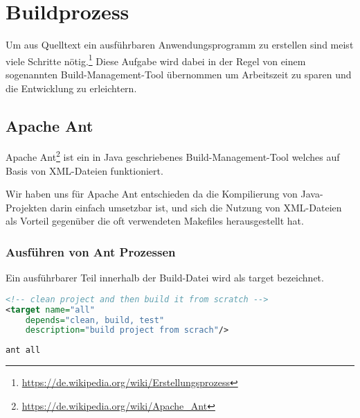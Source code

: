 

\section{Buildprozess}

Um aus Quelltext ein ausf\"uhrbaren Anwendungsprogramm zu erstellen sind meist viele Schritte nötig.\footnote{\url{https://de.wikipedia.org/wiki/Erstellungsprozess}} Diese Aufgabe wird dabei in der Regel von einem sogenannten Build-Management-Tool \"ubernommen um Arbeitszeit zu sparen und die Entwicklung zu erleichtern.

\subsection{Apache Ant}

Apache Ant\footnote{\url{https://de.wikipedia.org/wiki/Apache_Ant}} ist ein in Java geschriebenes Build-Management-Tool welches auf Basis von XML-Dateien funktioniert.

Wir haben uns f\"ur Apache Ant entschieden da die Kompilierung von Java-Projekten darin einfach umsetzbar ist, und sich die Nutzung von XML-Dateien als Vorteil gegen\"uber die oft verwendeten Makefiles herausgestellt hat.

\subsubsection{Ausf\"uhren von Ant Prozessen}

Ein ausf\"uhrbarer Teil innerhalb der Build-Datei wird als target bezeichnet.

\begin{lstlisting}[language=XML]
<!-- clean project and then build it from scratch -->
<target name="all"
	depends="clean, build, test"
	description="build project from scrach"/>
\end{lstlisting}

\begin{lstlisting}[language=bash]
ant all
\end{lstlisting}